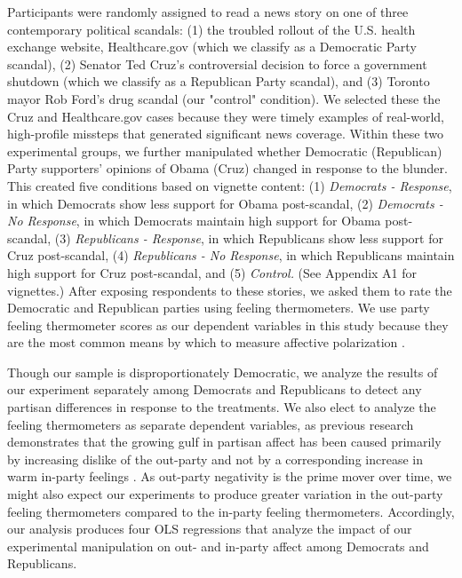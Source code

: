 \documentclass[12pt, letterpaper]{article}
\begin{document}
Participants were randomly assigned to read a news story on one of three contemporary political scandals: (1) the troubled rollout of the U.S. health exchange website, Healthcare.gov (which we classify as a Democratic Party scandal), (2) Senator Ted Cruz's controversial decision to force a government shutdown (which we classify as a Republican Party scandal), and (3) Toronto mayor Rob Ford's drug scandal (our "control" condition). We selected these the Cruz and Healthcare.gov cases because they were timely examples of real-world, high-profile missteps that generated significant news coverage. Within these two experimental groups, we further manipulated whether Democratic (Republican) Party supporters' opinions of Obama (Cruz) changed in response to the blunder. This created five conditions based on vignette content:  (1) \textit{Democrats - Response}, in which Democrats show less support for Obama post-scandal, (2) \textit{Democrats - No Response}, in which Democrats maintain high support for Obama post-scandal, (3) \textit{Republicans - Response}, in which Republicans show less support for Cruz post-scandal, (4) \textit{Republicans - No Response}, in which Republicans maintain high support for Cruz post-scandal, and (5) \textit{Control.} (See Appendix A1 for vignettes.) After exposing respondents to these stories, we asked them to rate the Democratic and Republican parties using feeling thermometers. We use party feeling thermometer scores as our dependent variables in this study because they are the most common means by which to measure affective polarization \citep[e.g.,][]{haidthetherington_2012,hetheringtonrudolph_2015,IyengarSoodLelkes2012,iyengarwestwood_2014,mason_2015}. 

Though our sample is disproportionately Democratic, we analyze the results of our experiment separately among Democrats and Republicans to detect any partisan differences in response to the treatments. We also elect to analyze the feeling thermometers as separate dependent variables, as previous research demonstrates that the growing gulf in partisan affect has been caused primarily by increasing dislike of the out-party and not by a corresponding increase in warm in-party feelings \citep{haidthetherington_2012, IyengarSoodLelkes2012}. As out-party negativity is the prime mover over time, we might also expect our experiments to produce greater variation in the out-party feeling thermometers compared to the in-party feeling thermometers. Accordingly, our analysis produces four OLS regressions that analyze the impact of our experimental manipulation on out- and in-party affect among Democrats and Republicans. 
\end{document}
